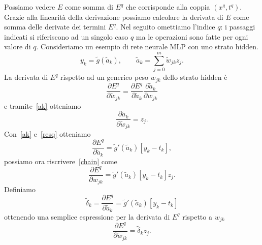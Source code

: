 \documentclass[11pt,a4paper,twoside,
openright]{book}
\begin{document}
Possiamo vedere $E$ come somma di $E^q$ che corrisponde alla coppia $(x^q,t^q)$. Grazie alla linearità della derivazione possiamo calcolare la derivata di $E$ come somma delle derivate dei termini $E^q$. Nel seguito omettiamo l'indice $q$: i passaggi indicati si riferiscono ad un singolo caso $q$ ma le operazioni sono fatte per ogni valore di $q$. Consideriamo un esempio di rete neurale MLP con uno strato hidden.
\begin{equation}
y_k=\tilde{g}(\tilde{a}_k), \qquad
 \tilde{a}_k=\sum\limits_{j=0}^m \tilde{w}_{jk}z_j.
\label{ak}
\end{equation}
La derivata di $E^q$ rispetto ad un generico peso $w_{jk}$ dello strato hidden è
\begin{equation}
\frac{\partial E^q}{\partial \tilde{w}_{jk}}=\frac{\partial E^q}{\partial \tilde{a}_k}\frac{\partial \tilde{a}_k}{\partial w_{jk}}
\label{chain}
\end{equation}
e tramite~\eqref{ak} otteniamo
\begin{equation}
\frac{\partial \tilde{a}_k}{\partial \tilde{w}_{jk}}=z_j.
\label{chain1}
\end{equation}
Con~\eqref{ak} e~\eqref{resq} otteniamo
\begin{equation}
\frac{\partial E^q}{\partial \tilde{a}_k}=\tilde{g}'(\tilde{a}_k)[y_k-t_k],
\label{chain2}
\end{equation}
possiamo ora riscrivere~\eqref{chain} come
\begin{equation}
\frac{\partial E^q}{\partial w_{jk}}=\tilde{g}'(\tilde{a}_k)[y_k-t_k]z_j.
\label{chain2}
\end{equation}
Definiamo
\begin{equation}
\tilde{\delta}_k = \frac{\partial E^q}{\partial \tilde{a}_k}=\tilde{g}'(\tilde{a}_k)[y_k-t_k]
\label{delta}
\end{equation}
ottenendo una semplice espressione per la derivata di $E^q$ rispetto a $w_{jk}$
\begin{equation}
\frac{\partial E^q}{\partial \tilde{w}_{jk}}=\tilde{\delta}_k z_j.
\label{deltaz}
\end{equation}
\end{document}
